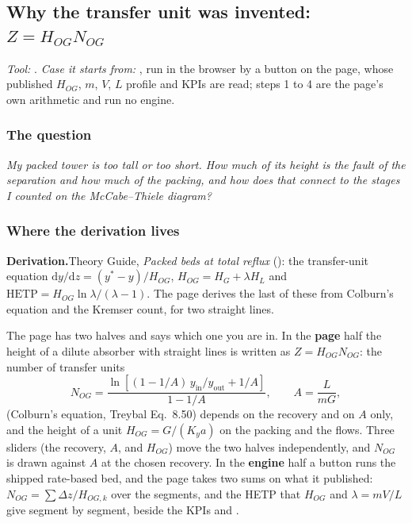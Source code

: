 \documentclass[11pt,a4paper]{article}
\newcommand{\derivation}[1]{%
  \smallskip\noindent\textbf{\sffamily\small Derivation.}\quad #1\par\smallskip}
\begin{document}
\subsection{Why the transfer unit was invented: $Z = H_{OG}N_{OG}$}\label{sec:edu-transfer-unit}


\noindent\textit{\small Tool:} .  \textit{\small
Case it starts from:} ,
run in the browser by a button on the page, whose published $H_{OG}$, $m$, $V$,
$L$ profile and KPIs are read; steps 1 to 4 are the page's own arithmetic and
run no engine.

\subsubsection*{The question}

\emph{My packed tower is too tall or too short.  How much of its height is the
fault of the separation and how much of the packing, and how does that connect
to the stages I counted on the McCabe--Thiele diagram?}

\subsubsection*{Where the derivation lives}

\derivation{Theory Guide, \emph{Packed beds at total reflux}
(\theorydest{sec:packed-bed}): the transfer-unit equation
$\mathrm{d}y/\mathrm{d}z = (y^*-y)/H_{OG}$, $H_{OG} = H_G + \lambda H_L$ and
$\mathrm{HETP} = H_{OG}\ln\lambda/(\lambda-1)$.  The page derives the last of
these from Colburn's equation and the Kremser count, for two straight lines.}

The page has two halves and says which one you are in.  In the \textbf{page}
half the height of a dilute absorber with straight lines is written as
$Z = H_{OG}N_{OG}$: the number of transfer units
\[
N_{OG} = \frac{\ln\!\left[(1-1/A)\,y_{\mathrm{in}}/y_{\mathrm{out}} + 1/A\right]}{1-1/A},
\qquad A = \frac{L}{mG},
\]
(Colburn's equation, Treybal Eq.~8.50) depends on the recovery and on $A$ only,
and the height of a unit $H_{OG} = G/(K_y a)$ on the packing and the flows.
Three sliders (the recovery, $A$, and $H_{OG}$) move the two halves
independently, and $N_{OG}$ is drawn against $A$ at the chosen recovery.  In the
\textbf{engine} half a button runs the shipped rate-based bed, and the page
takes two sums on what it published: $N_{OG} = \sum \Delta z/H_{OG,k}$ over the
segments, and the HETP that $H_{OG}$ and $\lambda = mV/L$ give segment by
segment, beside the KPIs  and .
\end{document}
